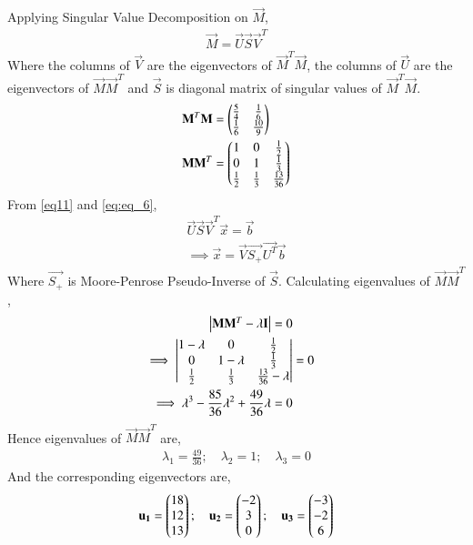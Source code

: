 \documentclass[journal,12pt,twocolumn]{IEEEtran}
\begin{document}
Applying Singular Value Decomposition on $\vec{M}$,
\begin{align} \label{eq:eq_6}
    \vec{M}=\vec{U}\vec{S}\vec{V}^T
\end{align}
Where the columns of $\vec{V}$ are the eigenvectors of $\vec{M}^T\vec{M}$, the columns of $\vec{U}$ are the eigenvectors of $\vec{M}\vec{M}^T$ and $\vec{S}$ is diagonal matrix of singular values of $\vec{M}^T\vec{M}$.
\begin{align}
    \mathbf{M}^T \mathbf{M} &= \begin{pmatrix}\tfrac{5}{4} & \tfrac{1}{6}  \\\tfrac{1}{6}  & \tfrac{10}{9} \end{pmatrix}\label{eq:eq_7} \\
    \mathbf{M} \mathbf{M}^T &= \begin{pmatrix}1 & 0 & \frac{1}{2}\\ 0 & 1 & \frac{1}{3} \\ \tfrac{1}{2} & \tfrac{1}{3} & \tfrac{13}{36}\end{pmatrix} \label{eq:eq_8}
\end{align}
From \eqref{eq11} and \eqref{eq:eq_6},
\begin{align}
    \vec{U} \vec{S} \vec{V}^T \vec{x} = \vec{b} \nonumber \\
    \implies \vec{x} = \vec{V} \vec{S_+} \vec{U^T} \vec{b} \label{eq:eq_9}
\end{align}
Where $\vec{S_+}$ is Moore-Penrose Pseudo-Inverse of $\vec{S}$. Calculating eigenvalues of $\vec{M}\vec{M}^T$,
\begin{align}
    \begin{vmatrix}\mathbf{M} \mathbf{M}^T - \lambda \mathbf{I}\end{vmatrix} = 0 \nonumber \\
    \implies \begin{vmatrix}1-\lambda & 0 & \frac{1}{2} \\ 0 & 1-\lambda & \frac{1}{3} \\ \frac{1}{2} & \frac{1}{3} & \frac{13}{36}-\lambda\end{vmatrix} &= 0 \nonumber \\
    \implies \lambda^3 - \frac{85}{36}\lambda^2 + \frac{49}{36}\lambda =0 \nonumber
\end{align}
Hence eigenvalues of $\vec{M}\vec{M}^T$ are,
\begin{align} \label{eq:eq_10}
    \lambda_1 = \frac{49}{36}; \quad \lambda_2 = 1; \quad \lambda_3 =0
\end{align}
And the corresponding eigenvectors are,
\begin{align}
     \mathbf{u_1} = \begin{pmatrix}18 \\12 \\ 13\end{pmatrix}; \quad \mathbf{u_2} = \begin{pmatrix}-2 \\3 \\ 0\end{pmatrix};\quad 
    \mathbf{u_3} = \begin{pmatrix}-3 \\ -2 \\ 6\end{pmatrix}\label{eq:eq_11} 
\end{align}
\end{document}

